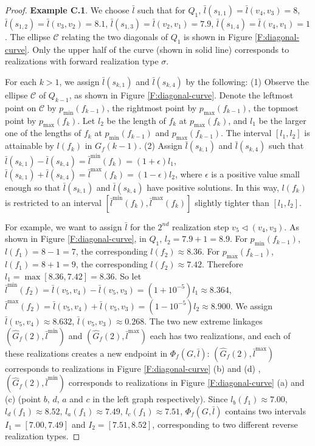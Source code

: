 \documentclass[secthm,amsthm,english]{article}
\theoremstyle{definition}
\theoremstyle{remark}
\begin{document}
\begin{proof}
\noindent \textbf{Example C.1}. 
We choose $\bar{l}$ such that for $Q_{1}$, $\bar{l}(s_{1,1})=\bar{l}(v_{4},v_{3})=8$,
$\bar{l}(s_{1,2})=\bar{l}(v_{3},v_{2})=8.1$, $\bar{l}(s_{1,3})=\bar{l}(v_{2},v_{1})=7.9$,
$\bar{l}(s_{1,4})=\bar{l}(v_{4},v_{1})=1$. 
The ellipse $\mathcal{C}$ relating
the two diagonals of $Q_{1}$ is shown in Figure \ref{F:diagonal-curve}. Only
the upper half of the curve (shown in solid line) corresponds to realizations
with forward realization type $\sigma$. 

For each $k>1$,
we assign $\bar{l}(s_{k,1})$ and $\bar{l}(s_{k,4})$
by the following: 
(1) Observe the ellipse $\mathcal{C}$ of $Q_{k-1}$, as shown in Figure \ref{F:diagonal-curve}. 
Denote the leftmost point on $\mathcal{C}$ by $p_{\min}(f_{k-1})$, the rightmost point by $p_{\max}(f_{k-1})$, the topmost point by $p_{\max}(f_{k})$. 
Let $l_2$ be the length of $f_k$ at $p_{\max}(f_{k})$, 
and $l_1$ be the larger one of the lengths of $f_k$ at $p_{\min}(f_{k-1})$ and $p_{\max}(f_{k-1})$. 
The interval $[l_1,l_2]$ is attainable by $l(f_k)$ in $G_f(k-1)$. 
(2) Assign $\bar{l}(s_{k,1})$ and $\bar{l}(s_{k,4})$ 
such that $\bar{l}(s_{k,1})-\bar{l}(s_{k,4})=\bar{l}^{\min}(f_k)=(1+\epsilon)l_1$,
$\bar{l}(s_{k,1})+\bar{l}(s_{k,4})=\bar{l}^{\max}(f_k)=(1-\epsilon)l_2$, 
where $\epsilon$ is a positive value small enough so that $\bar{l}(s_{k,1})$
and $\bar{l}(s_{k,4})$ have positive solutions. 
In this way, $l(f_k)$ is restricted to an interval $[\bar{l}^{\min}(f_k),\bar{l}^{\max}(f_k)]$
slightly tighter than $[l_1,l_2]$.


For example, we want to assign $\bar{l}$ for the $2^{nd}$ realization step $v_{5}\triangleleft(v_{4},v_{3})$.
As shown in Figure \ref{F:diagonal-curve}, in $Q_{1}$, $l_2=7.9+1=8.9$. 
For $p_{\min}(f_{k-1})$, $l(f_1) = 8-1 = 7$, the corresponding $l(f_2) \approx 8.36$. For $p_{\max}(f_{k-1})$, $l(f_1) = 8+1 = 9$, the corresponding $l(f_2) \approx 7.42$. 
Therefore $l_1=\max[8.36, 7.42] = 8.36$.
So let $\bar{l}^{\min}(f_2)=\bar{l}(v_{5},v_{4})-\bar{l}(v_{5},v_{3})=(1+10^{-5})l_1 \approx 8.364$,
$\bar{l}^{\max}(f_2)=\bar{l}(v_{5},v_{4})+\bar{l}(v_{5},v_{3})=(1-10^{-5})l_2 \approx 8.900$.
We assign $\bar{l}(v_{5},v_{4}) \approx 8.632$, $\bar{l}(v_{5},v_{3}) \approx 0.268$.
The two new extreme linkages $(\hat{G}_{f}(2),\bar{l}^{\min})$ and
$(\hat{G}_{f}(2),\bar{l}^{\max})$ each has two realizations, and each
of these realizations creates a new endpoint in  $\Phi_{f}(G,\bar{l})$:
$(\hat{G}_{f}(2),\bar{l}^{\max})$ corresponds to realizations in Figure
\ref{F:diagonal-curve} (b) and (d) , $(\hat{G}_{f}(2),\bar{l}^{\min})$
corresponds to realizations in Figure \ref{F:diagonal-curve} (a)
and (c) (point $b$, $d$, $a$ and $c$ in the left graph respectively).
Since $l_{b}(f_{1})\approx7.00$, $l_{d}(f_{1})\approx8.52$,
$l_{a}(f_{1})\approx7.49$, $l_{c}(f_{1})\approx7.51$,
$\Phi_{f}(G,\bar{l})$ contains two intervals $I_{1}=[7.00,7.49]$
and $I_{2}=[7.51,8.52]$, 
corresponding to two different reverse realization types. 



\end{proof}
\end{document}
